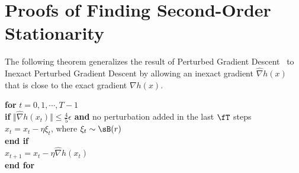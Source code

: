 

\section{Proofs of Finding Second-Order Stationarity} \label{apx:2nd}

The following theorem generalizes the result of Perturbed Gradient Descent~\citep{jin2017escape}
to Inexact Perturbed Gradient Descent by
allowing an inexact gradient $\hat \nabla h(x)$ that is close to the exact gradient $\nabla h(x)$.

\begin{algorithm*}[htbp]  
\caption{Inexact Perturbed Gradient Descent} \label{alg:iPGD}
\begin{algorithmic}[1] 
\STATE \textbf{for} $t = 0,1,\cdots,T-1$ \\
\STATE \quad \textbf{if} $ \Vert \hat \nabla h(x_t) \Vert \le \frac{4}{5} \epsilon$ \textbf{and} no perturbation added in the last $\fT$ steps \\[1mm]
\STATE \quad \quad $x_{t} = x_t - \eta \xi_t $, where $\xi_t \sim \sB(r)$ \\[1mm]
\STATE \quad \textbf{end if} \\[1mm]
\STATE \quad $x_{t+1} = x_t -  \eta  \hat \nabla h(x_t)$ \\[1mm]
\STATE \textbf{end for} \\[1mm]
\end{algorithmic}
\end{algorithm*}

